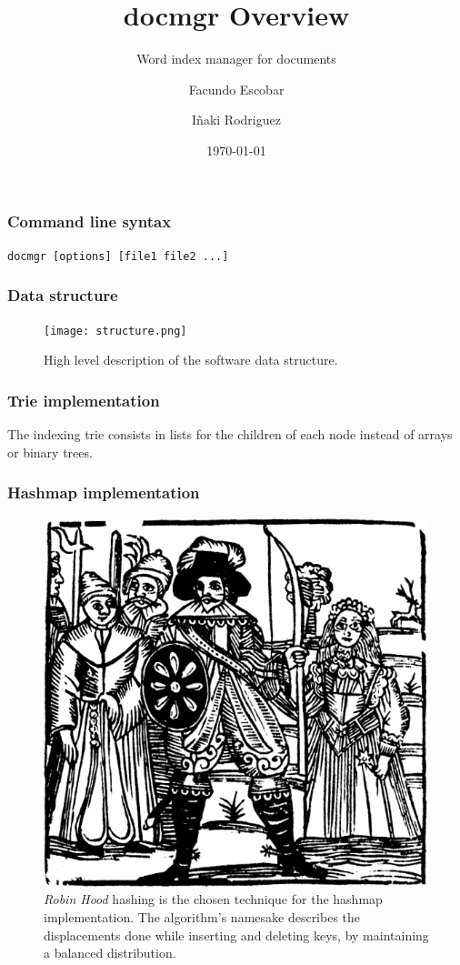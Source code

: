 \documentclass{beamer}
\title{docmgr Overview}
\subtitle{Word index manager for documents}
\author[Facundo E. \and Iñaki R.]{Facundo Escobar \and Iñaki Rodriguez}
\institute[UnCuyo]{Universidad Nacional de Cuyo}
\date{\today}
\begin{document}
\begin{frame}
  \titlepage
\end{frame}

\begin{frame}[c]
  \frametitle{Command line syntax}
  \centering
  \texttt{docmgr [options] [file1 file2 ...]}
\end{frame}

\begin{frame}
  \frametitle{Data structure}
  \begin{figure}
    \texttt{[image: structure.png]}
    \caption{High level description of the software data structure.}
    \label{fig:structure1}
  \end{figure}
\end{frame}

\begin{frame}[c]
  \frametitle{Trie implementation}
  \centering
  The indexing trie consists in lists for the children of each node instead of arrays or
  binary trees.
\end{frame}

\begin{frame}
  \frametitle{Hashmap implementation}
  \begin{figure}
    \includegraphics[width=0.3\linewidth]{Robin-hood-and-maid-marion-01.png}
    \caption{
      \textit{Robin Hood} hashing is the chosen technique for the hashmap implementation.
      The algorithm's namesake describes the displacements done while inserting and
      deleting keys, by maintaining a balanced distribution.
    }
    \label{fig:robinhood2}
  \end{figure}
\end{frame}
\end{document}
